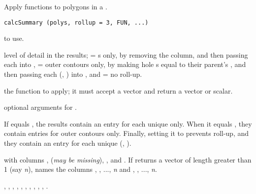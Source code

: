 \documentclass[letterpaper]{book}
\begin{document}
%
\begin{Description}\relax
Apply functions to polygons in a .
\end{Description}
%
\begin{Usage}
\begin{verbatim}
calcSummary (polys, rollup = 3, FUN, ...)
\end{verbatim}
\end{Usage}
%
\begin{Arguments}
\begin{ldescription}
\item[\code{polys}]  to use.
\item[\code{rollup}] level of detail in the results;  = s
only, by removing the  column, and then passing each
 into ,  = outer contours only, by making
hole s equal to their parent's , and then passing
each (, ) into , and  = no
roll-up.
\item[\code{FUN}] the function to apply; it must accept a vector and return a
vector or scalar.
\item[\code{...}] optional arguments for .
\end{ldescription}
\end{Arguments}
%
\begin{Details}\relax
If  equals , the results contain an entry for
each unique  only.  When it equals , they contain
entries for outer contours only.  Finally, setting it to 
prevents roll-up, and they contain an entry for each unique
(, ).
\end{Details}
%
\begin{Value}
 with columns ,  (\emph{may be missing}),
, and .  If  returns a vector of length
greater than 1 (say \emph{n}), names the columns , ,
..., \emph{n} and , , ..., \emph{n}.
\end{Value}
%
\begin{SeeAlso}\relax
{},
,
,
,
,
,
,
,
,
,
.
\end{SeeAlso}
\end{document}
